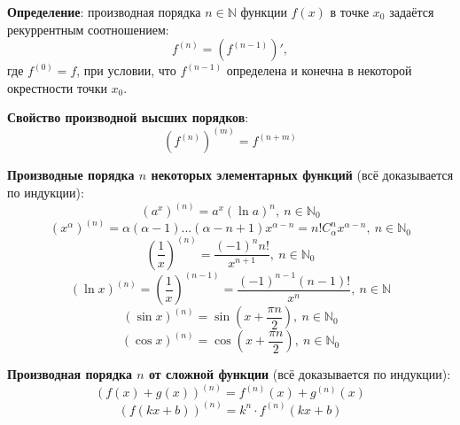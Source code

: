 \documentclass[12pt, a4paper, reqno]{article}
\begin{document}
    \textbf{Определение}: производная порядка $n\in\mathbb{N}$ функции $f(x)$ в точке $x_0$ задаётся
    рекуррентным соотношением:
    \begin{equation*}
        f^{(n)} = \left(f^{(n - 1)}\right)',
    \end{equation*}
    где $f^{(0)} = f$, при условии, что $f^{(n - 1)}$ определена и конечна в некоторой окрестности
    точки $x_0$.

    \textbf{Свойство производной высших порядков}:
    \begin{equation*}
        \left(f^{(n)}\right)^{(m)} = f^{(n + m)}
    \end{equation*}

    \textbf{Производные порядка $n$ некоторых элементарных функций} (всё доказывается по индукции):
    \begin{equation*}
        (a^x)^{(n)} = a^x(\ln{a})^n,\ n\in\mathbb{N}_0
    \end{equation*}
    \begin{equation*}
        (x^{\alpha})^{(n)} = \alpha(\alpha - 1)...(\alpha -n + 1)x^{\alpha - n} =
        n!C_{\alpha}^{n}x^{\alpha - n},\ n\in\mathbb{N}_0
    \end{equation*}
    \begin{equation*}
        \left(\dfrac{1}{x}\right)^{(n)} = \dfrac{(-1)^nn!}{x^{n + 1}},\ n\in\mathbb{N}_0
    \end{equation*}
    \begin{equation*}
        (\ln{x})^{(n)} = \left(\dfrac{1}{x}\right)^{(n - 1)} =
        \dfrac{(-1)^{n - 1}(n - 1)!}{x^n},\ n\in\mathbb{N}
    \end{equation*}
    \begin{equation*}
        (\sin{x})^{(n)} = \sin{\left(x + \dfrac{\pi n}{2}\right)},\ n\in\mathbb{N}_0
    \end{equation*}
    \begin{equation*}
        (\cos{x})^{(n)} = \cos{\left(x + \dfrac{\pi n}{2}\right)},\ n\in\mathbb{N}_0
    \end{equation*}

    \textbf{Производная порядка $n$ от сложной функции} (всё доказывается по индукции):
    \begin{equation*}
        (f(x) + g(x))^{(n)} = f^{(n)}(x) + g^{(n)}(x)
    \end{equation*}
    \begin{equation*}
        (f(kx + b))^{(n)} = k^n\cdot f^{(n)}(kx + b)
    \end{equation*}
\end{document}
